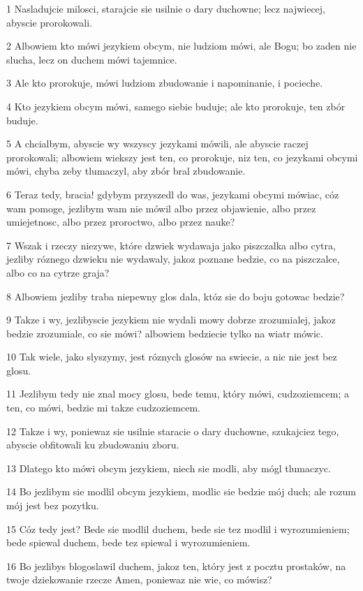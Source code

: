\par 1 Nasladujcie milosci, starajcie sie usilnie o dary duchowne; lecz najwiecej, abyscie prorokowali.
\par 2 Albowiem kto mówi jezykiem obcym, nie ludziom mówi, ale Bogu; bo zaden nie slucha, lecz on duchem mówi tajemnice.
\par 3 Ale kto prorokuje, mówi ludziom zbudowanie i napominanie, i pocieche.
\par 4 Kto jezykiem obcym mówi, samego siebie buduje; ale kto prorokuje, ten zbór buduje.
\par 5 A chcialbym, abyscie wy wszyscy jezykami mówili, ale abyscie raczej prorokowali; albowiem wiekszy jest ten, co prorokuje, niz ten, co jezykami obcymi mówi, chyba zeby tlumaczyl, aby zbór bral zbudowanie.
\par 6 Teraz tedy, bracia! gdybym przyszedl do was, jezykami obcymi mówiac, cóz wam pomoge, jezlibym wam nie mówil albo przez objawienie, albo przez umiejetnosc, albo przez proroctwo, albo przez nauke?
\par 7 Wszak i rzeczy niezywe, które dzwiek wydawaja jako piszczalka albo cytra, jezliby róznego dzwieku nie wydawaly, jakoz poznane bedzie, co na piszczalce, albo co na cytrze graja?
\par 8 Albowiem jezliby traba niepewny glos dala, któz sie do boju gotowac bedzie?
\par 9 Takze i wy, jezlibyscie jezykiem nie wydali mowy dobrze zrozumialej, jakoz bedzie zrozumiale, co sie mówi? albowiem bedziecie tylko na wiatr mówic.
\par 10 Tak wiele, jako slyszymy, jest róznych glosów na swiecie, a nic nie jest bez glosu.
\par 11 Jezlibym tedy nie znal mocy glosu, bede temu, który mówi, cudzoziemcem; a ten, co mówi, bedzie mi takze cudzoziemcem.
\par 12 Takze i wy, poniewaz sie usilnie staracie o dary duchowne, szukajciez tego, abyscie obfitowali ku zbudowaniu zboru.
\par 13 Dlatego kto mówi obcym jezykiem, niech sie modli, aby mógl tlumaczyc.
\par 14 Bo jezlibym sie modlil obcym jezykiem, modlic sie bedzie mój duch; ale rozum mój jest bez pozytku.
\par 15 Cóz tedy jest? Bede sie modlil duchem, bede sie tez modlil i wyrozumieniem; bede spiewal duchem, bede tez spiewal i wyrozumieniem.
\par 16 Bo jezlibys blogoslawil duchem, jakoz ten, który jest z pocztu prostaków, na twoje dziekowanie rzecze Amen, poniewaz nie wie, co mówisz?
